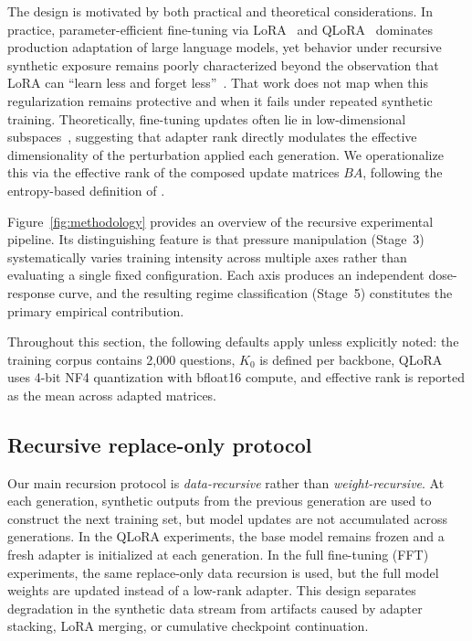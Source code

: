 \documentclass[a4paper,fleqn]{cas-dc}
\begin{document}
The design is motivated by both practical and theoretical considerations. In
practice, parameter-efficient fine-tuning via LoRA~\citep{hu2022} and
QLoRA~\citep{dettmers2023} dominates production adaptation of large language
models, yet behavior under recursive synthetic exposure remains poorly
characterized beyond the observation that LoRA can ``learn less and forget
less''~\citep{biderman2024}. That work does not map when this regularization
remains protective and when it fails under repeated synthetic training.
Theoretically, fine-tuning updates often lie in low-dimensional
subspaces~\citep{aghajanyan2021}, suggesting that adapter rank directly
modulates the effective dimensionality of the perturbation applied each
generation. We operationalize this via the effective rank of the composed update
matrices $BA$, following the entropy-based definition of
\citet{roy2007}.

Figure~\ref{fig:methodology} provides an overview of the recursive experimental
pipeline. Its distinguishing feature is that pressure manipulation (Stage~3)
systematically varies training intensity across multiple axes rather than
evaluating a single fixed configuration. Each axis produces an independent
dose-response curve, and the resulting regime classification (Stage~5)
constitutes the primary empirical contribution.

Throughout this section, the following defaults apply unless explicitly noted:
the training corpus contains 2{,}000 questions, $K_0$ is defined per backbone,
QLoRA uses 4-bit NF4 quantization with bfloat16 compute, and effective rank is
reported as the mean across adapted matrices.

\subsection{Recursive replace-only protocol}\label{sec:protocol}

Our main recursion protocol is \textit{data-recursive} rather than
\textit{weight-recursive}. At each generation, synthetic outputs from the
previous generation are used to construct the next training set, but model
updates are not accumulated across generations. In the QLoRA experiments, the base model remains
frozen and a fresh adapter is initialized at each generation. In the full
fine-tuning (FFT) experiments, the same replace-only data recursion is used, but
the full model weights are updated instead of a low-rank adapter. This design
separates degradation in the synthetic data stream from artifacts caused by
adapter stacking, LoRA merging, or cumulative checkpoint continuation.
\end{document}
